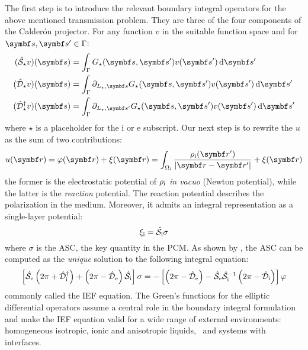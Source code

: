 The first step is to introduce the relevant boundary integral operators for the
above mentioned transmission problem.
They are three of the four components of the Calder\'on projector.
For any function $v$ in the suitable function space and for $\vect{s}, \vect{s}^\prime \in \Gamma$:
\begin{subequations}
\begin{align}
  (\bi{S}_\star v)(\vect{s}) &= \int_\Gamma
  G_\star(\vect{s}, \vect{s}^\prime)v(\vect{s}^\prime)\diff
  \vect{s}^\prime \label{eq:S} \\
  (\bi{D}_\star v)(\vect{s}) &= \int_\Gamma \partial_{L_\star,\vect{s}}
  G_\star(\vect{s}, \vect{s}^\prime)v(\vect{s}^\prime)\diff
  \vect{s}^\prime \label{eq:D} \\
  (\bi{D}^\dagger_\star v)(\vect{s}) &= \int_\Gamma
\partial_{L_\star,\vect{s}^\prime}
  G_\star(\vect{s}, \vect{s}^\prime)v(\vect{s}^\prime)\diff
  \vect{s}^\prime \label{eq:D-dagger}
\end{align}
\end{subequations}
where $\star$ is a placeholder for the $\mathrm{i}$ or $\mathrm{e}$ subscript.
Our next step is to rewrite the $u$ as the sum of two contributions:
\begin{equation}
  u(\vect{r}) = \esp(\vect{r}) + \xi(\vect{r}) = \int_{\Omegai}
  \frac{\rhoi(\vect{r}^\prime)}{|\vect{r}-\vect{r}^\prime|}
  + \xi(\vect{r})
\end{equation}
the former is the electrostatic potential of $\rho_\mathrm{i}$ \emph{in vacuo}
(Newton potential), while the latter is the \emph{reaction} potential.
The reaction potential describes the polarization in the medium.
Moreover, it admits an integral representation as a single-layer
potential:
\begin{equation}
  \xi_\mathrm{i} = \hat{\mathcal{S}}_\mathrm{i}\sigma
\end{equation}
where $\sigma$ is the \gls{ASC}, the key quantity in the \acrshort{PCM}.
As shown by \citeauthor{Cances1998-og}, the \acrshort{ASC} can be computed
as the \emph{unique} solution to the following integral equation:
\begin{equation}\label{eq:full-IEF}
  \left[ \hat{\mathcal{S}}_\mathrm{e}\left(2\pi + \hat{\mathcal{D}}^\dagger_\mathrm{i}\right)
  +
  \left(2\pi - \hat{\mathcal{D}}_\mathrm{e}\right)\hat{\mathcal{S}}_\mathrm{i}
  \right]\sigma =
  -\left[\left(2\pi-\hat{\mathcal{D}}_\mathrm{e}\right)
  -\hat{\mathcal{S}}_\mathrm{e}\hat{\mathcal{S}}_\mathrm{i}^{-1}
  \left(2\pi-\hat{\mathcal{D}}_\mathrm{i}\right)
  \right]\varphi
\end{equation}
commonly called the \gls{IEF} equation.
The Green's functions for the elliptic differential operators
assume a central role in the boundary integral formulation and make the
\acrshort{IEF} equation valid for a wide range of external
environments: homogeneous isotropic, ionic and anisotropic
liquids,~\autocite{Cances1998-og}
and systems with interfaces.~\autocite{Corni2002-dr, Frediani2004-er,
Delgado2013-kd, DiRemigio2016-nn}

